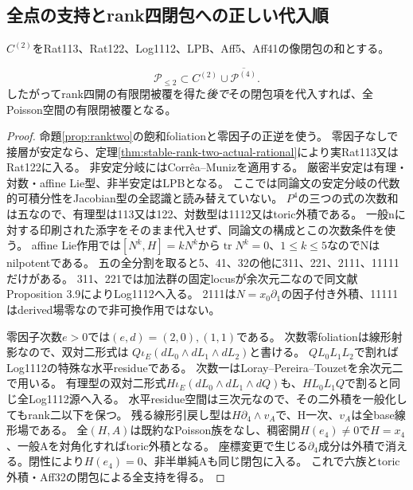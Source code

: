 \subsection{全点の支持とrank四閉包への正しい代入順}
$C^{(2)}$をRat113、Rat122、Log1112、LPB、Aff5、Aff41の像閉包の和とする。
\begin{proposition}[階数二の全支持]\label{prop:rank2-support}
\[
 \mathcal P_{\le2}\subset C^{(2)}\cup\overline{\mathcal P^{(4)}}.
\]
したがってrank四開の有限閉被覆を得た\emph{後で}その閉包項を代入すれば、全Poisson空間の有限閉被覆となる。
\end{proposition}
\begin{proof}
命題\ref{prop:ranktwo}の飽和foliationと零因子の正逆を使う。
零因子なしで接層が安定なら、定理\ref{thm:stable-rank-two-actual-rational}により実Rat113又はRat122に入る。
非安定分岐にはCorr\^ea--Muniz\cite[本文Theorem 4.1]{CM}を適用する。
厳密半安定は有理・対数・affine Lie型、非半安定はLPBとなる。
ここでは同論文の安定分岐の代数的可積分性をJacobian型の全認識と読み替えていない。
$P^4$の三つの式の次数和は五なので、有理型は113又は122、対数型は1112又はtoric外積である。
一般nに対する印刷された添字をそのまま代入せず、同論文の構成とこの次数条件を使う。
affine Lie作用では$[N^k,H]=kN^k$から$\operatorname{tr}N^k=0$、$1\le k\le5$なのでNはnilpotentである。
五の全分割を取ると5、41、32の他に311、221、2111、11111だけがある。
311、221では加法群の固定locusが余次元二なので同文献Proposition 3.9によりLog1112へ入る。
2111は$N=x_0\partial_1$の因子付き外積、11111はderived場零なので非可換作用ではない。

零因子次数$e>0$では$(e,d)=(2,0),(1,1)$である。
次数零foliationは線形射影なので、双対二形式は
$Q\iota_E(dL_0\wedge dL_1\wedge dL_2)$と書ける。
$QL_0L_1L_2$で割ればLog1112の特殊な水平residueである。
次数一はLoray--Pereira--Touzet\cite[Theorem 6.2, printed pp.17--18]{LPT}を余次元二で用いる。
有理型の双対二形式$H\iota_E(dL_0\wedge dL_1\wedge dQ)$も、$HL_0L_1Q$で割ると同じ全Log1112源へ入る。
水平residue空間は三次元なので、その二外積を一般化してもrank二以下を保つ。
残る線形引戻し型は$H\partial_4\wedge v_A$で、H一次、$v_A$は全base線形場である。
全$(H,A)$は既約なPoisson族をなし、稠密開$H(e_4)\ne0$で$H=x_4$、一般Aを対角化すればtoric外積となる。
座標変更で生じる$\partial_4$成分は外積で消える。閉性により$H(e_4)=0$、非半単純Aも同じ閉包に入る。
これで六族とtoric外積・Aff32の閉包による全支持を得る。


\end{proof}
